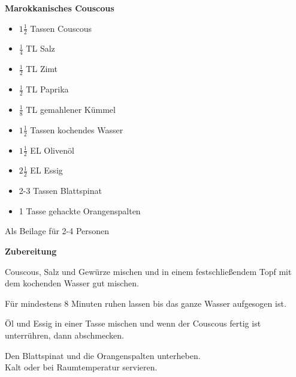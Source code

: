 


\parindent0pt	

\pagestyle{empty}


\textbf{{\LARGE Marokkanisches Couscous}}%


\hrulefill
\vspace*{\fill}
\begin{multicols}{2}	


\begin{itemize}
\item  $1\frac{1}{2}$ Tassen Couscous
\item  $\frac{1}{4}$ TL Salz
\item  $\frac{1}{2}$ TL  Zimt
\item $\frac{1}{2}$ TL Paprika
\item  $\frac{1}{8}$ TL gemahlener Kümmel
\item  $1\frac{1}{2}$ Tassen kochendes Wasser
\item $1\frac{1}{2}$ EL Olivenöl
\item $2\frac{1}{2}$ EL Essig
\item 2-3 Tassen Blattspinat
\item 1 Tasse gehackte Orangenspalten
\end{itemize}
\vfill									
\end{multicols}

\vspace{2cm}			%
\begin{center}			%
Als Beilage für 2-4 Personen
\end{center}


\vfill
\newpage
\textbf{{\LARGE Zubereitung}}%

\hrulefill

\vspace*{\fill}
\begin{multicols}{2}

Couscous, Salz und Gewürze mischen und in einem festschließendem Topf mit dem kochenden Wasser
gut mischen.\newline 

Für mindestens 8 Minuten ruhen lassen bis das ganze Wasser aufgesogen ist.\newline

Öl und Essig in einer Tasse mischen und wenn der Couscous fertig ist unterrühren, dann abschmecken.

Den Blattspinat und die Orangenspalten unterheben.\\

Kalt oder bei Raumtemperatur servieren.

\end{multicols}
\vfill
